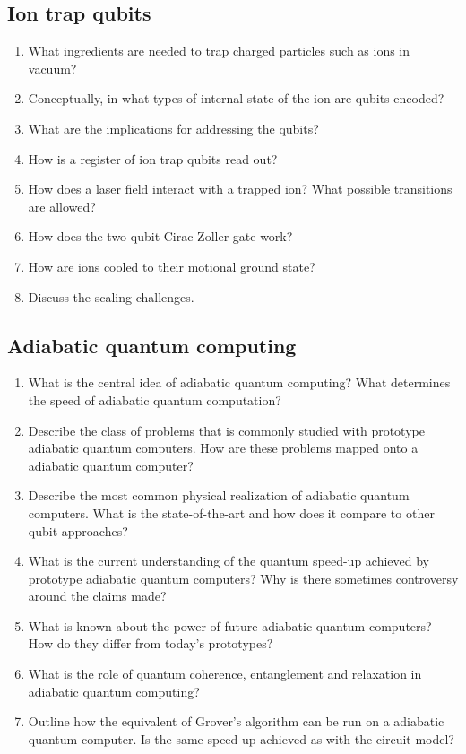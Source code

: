 \documentclass[a4paper]{scrartcl}
\newcommand{\qa}[2]{#1\\ \textit{#2}}
\begin{document}
\subsection*{Ion trap qubits}
\begin{enumerate}
\item \qa{What ingredients are needed to trap charged particles such as ions in vacuum?}{}
\item \qa{Conceptually, in what types of internal state of the ion are qubits encoded?}{}
\item \qa{What are the implications for addressing the qubits?}{}
\item \qa{How is a register of ion trap qubits read out?}{}
\item \qa{How does a laser field interact with a trapped ion? What possible transitions are allowed?}{}
\item \qa{How does the two-qubit Cirac-Zoller gate work?}{}
\item \qa{How are ions cooled to their motional ground state?}{}
\item \qa{Discuss the scaling challenges.}{}
\end{enumerate}

\subsection*{Adiabatic quantum computing}
\begin{enumerate}
\item \qa{What is the central idea of adiabatic quantum computing? What determines the speed of adiabatic quantum computation?}{}
\item \qa{Describe the class of problems that is commonly studied with prototype adiabatic quantum computers. How are these problems mapped onto a adiabatic quantum computer?}{}
\item \qa{Describe the most common physical realization of adiabatic quantum computers. What is the state-of-the-art and how does it compare to other qubit approaches?}{}
\item \qa{What is the current understanding of the quantum speed-up achieved by prototype adiabatic quantum computers? Why is there sometimes controversy around the claims made? }{}
\item \qa{What is known about the power of future adiabatic quantum computers? How do they differ from today's prototypes?}{}
\item \qa{What is the role of quantum coherence, entanglement and relaxation in adiabatic quantum computing?}{}
\item \qa{Outline how the equivalent of Grover's algorithm can be run on a adiabatic quantum computer. Is the same speed-up achieved as with the circuit model? }{}


\end{enumerate}
\end{document}
